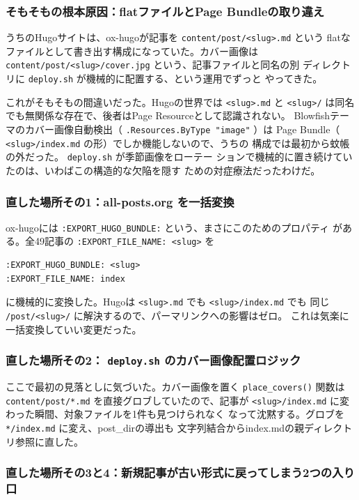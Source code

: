 \documentclass[11pt]{article}
\begin{document}
\subsubsection{そもそもの根本原因：flatファイルとPage Bundleの取り違え}
\label{sec:org32dd25d}

うちのHugoサイトは、ox-hugoが記事を \texttt{content/post/<slug>.md} という
flatなファイルとして書き出す構成になっていた。カバー画像は
\texttt{content/post/<slug>/cover.jpg} という、記事ファイルと同名の別
ディレクトリに \texttt{deploy.sh} が機械的に配置する、という運用でずっと
やってきた。

これがそもそもの間違いだった。Hugoの世界では \texttt{<slug>.md} と \texttt{<slug>/}
は同名でも無関係な存在で、後者はPage Resourceとして認識されない。
Blowfishテーマのカバー画像自動検出（ \texttt{.Resources.ByType "image"} ）は
Page Bundle（ \texttt{<slug>/index.md} の形）でしか機能しないので、うちの
構成では最初から蚊帳の外だった。 \texttt{deploy.sh} が季節画像をローテー
ションで機械的に置き続けていたのは、いわばこの構造的な欠陥を隠す
ための対症療法だったわけだ。
\subsubsection{直した場所その1：all-posts.org を一括変換}
\label{sec:orgf2f460d}

ox-hugoには \texttt{:EXPORT\_HUGO\_BUNDLE:} という、まさにこのためのプロパティ
がある。全49記事の \texttt{:EXPORT\_FILE\_NAME: <slug>} を

\begin{verbatim}
:EXPORT_HUGO_BUNDLE: <slug>
:EXPORT_FILE_NAME: index
\end{verbatim}

に機械的に変換した。Hugoは \texttt{<slug>.md} でも \texttt{<slug>/index.md} でも
同じ \texttt{/post/<slug>/} に解決するので、パーマリンクへの影響はゼロ。
これは気楽に一括変換していい変更だった。
\subsubsection{直した場所その2： \texttt{deploy.sh} のカバー画像配置ロジック}
\label{sec:org6062ea2}

ここで最初の見落としに気づいた。カバー画像を置く \texttt{place\_covers()}
関数は \texttt{content/post/*.md} を直接グロブしていたので、記事が
\texttt{<slug>/index.md} に変わった瞬間、対象ファイルを1件も見つけられなく
なって沈黙する。グロブを \texttt{*/index.md} に変え、post\_dirの導出も
文字列結合からindex.mdの親ディレクトリ参照に直した。
\subsubsection{直した場所その3と4：新規記事が古い形式に戻ってしまう2つの入り口}
\label{sec:orgb5254a4}
\end{document}
